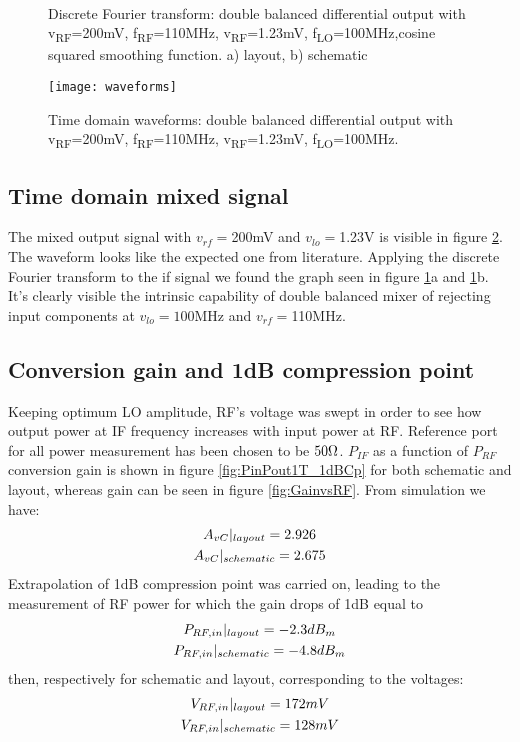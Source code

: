 \begin{figure}[H] 
	\centering
	 \\
	\caption{Discrete Fourier transform: double balanced differential output with v\textsubscript{RF}=200mV,  f\textsubscript{RF}=110MHz, v\textsubscript{RF}=1.23mV, f\textsubscript{LO}=100MHz,cosine squared smoothing function. a) layout, b) schematic}
	\label{fig:TdomaniDFT}
\end{figure}

\begin{figure}[H]
	\centering
	\texttt{[image: waveforms]}
	\caption{Time domain waveforms: double balanced differential output with v\textsubscript{RF}=200mV,  f\textsubscript{RF}=110MHz, v\textsubscript{RF}=1.23mV, f\textsubscript{LO}=100MHz.}
	\label{fig:TdomaniWF}
\end{figure}

\subsection{Time domain mixed signal}
The mixed output signal with \(v_{rf}=\)200mV and \(v_{lo}=\)1.23V is visible in figure \ref{fig:TdomaniWF}. The waveform looks like the expected one from literature.
Applying the discrete Fourier transform to the if signal we found the graph seen in figure \ref{fig:TdomaniDFT}a and \ref{fig:TdomaniDFT}b.
It's clearly visible the intrinsic capability of double balanced mixer of rejecting input components at \(v_{lo}=100\)MHz and \(v_{rf}=\)110MHz.

\subsection{Conversion gain and 1dB compression point}
Keeping optimum LO amplitude, RF's voltage was swept in order to see how output power at IF frequency increases with input power at RF. Reference port for all power measurement has been chosen to be \(50\ohm\). \(P_{IF}\) as a function of \(P_{RF}\) conversion gain is shown in figure \ref{fig:PinPout1T_1dBCp} for both schematic and layout, whereas gain can be seen in figure \ref{fig:GainvsRF}. 
From simulation we have:
\begin{gather}
A_{vC}|_{layout}=2.926 \notag \\ 
A_{vC}|_{schematic}=2.675 \notag
\end{gather}
Extrapolation of 1dB compression point was carried on, leading to the measurement of RF power for which the gain drops of 1dB equal to 
\begin{gather}
P_{RF,in}|_{layout}=-2.3dB_{m} \notag \\
P_{RF,in}|_{schematic}=-4.8dB_{m} \notag
\end{gather}
then, respectively for schematic and layout, corresponding to the voltages:
\begin{gather}
V_{RF,in}|_{layout}=172mV \notag \\
V_{RF,in}|_{schematic}=128mV \notag
\end{gather}



